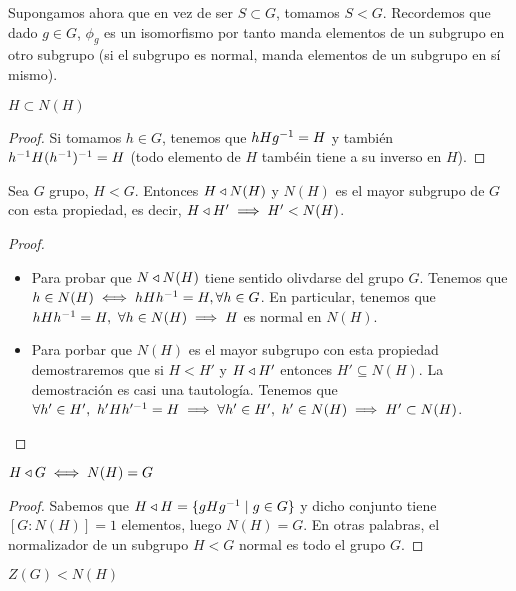 Supongamos ahora que en vez de ser $S \subset G$, tomamos $S < G$. Recordemos que dado $g\in G$, $\phi_g$ es un isomorfismo por tanto manda elementos de un subgrupo en otro subgrupo (si el subgrupo es normal, manda elementos de un subgrupo en sí mismo).

\begin{pro}
	$H \subset N(H)$
\end{pro}

\begin{proof}
	Si tomamos $h \in G$, tenemos que $hHg^{-1} = H$ y también $h^{-1}H(h^{-1})^{-1} = H$ (todo elemento de $H$ tambéin tiene a su inverso en $H$).
\end{proof}

\begin{thm}
	Sea $G$ grupo, $H < G$. Entonces $H \mathbin{\triangleleft} N(H)$ y $N(H)$ es el mayor subgrupo de $G$ con esta propiedad, es decir, $H \mathbin{\triangleleft} H' \implies H' < N(H)$.
\end{thm}

\begin{proof}$ $\newline
	\begin{itemize}
		\item Para probar que $N\mathbin{\triangleleft} N(H)$ tiene sentido olivdarse del grupo $G$. Tenemos que $h \in N(H) \iff hHh^{-1} = H, \forall h \in G$. En particular, tenemos que $hHh^{-1} = H,\ \forall h \in N(H) \implies H$ es normal en $N(H)$.
		
		\item Para porbar que $N(H)$ es el mayor subgrupo con esta propiedad demostraremos que si $H < H'$ y $H \mathbin{\triangleleft} H'$ entonces $H' \subseteq N(H)$. La demostración es casi una tautología. Tenemos que $\forall h' \in H',\ h'Hh'^{-1} = H \implies \forall h' \in H',\ h' \in N(H) \implies H' \subset N(H)$.
	\end{itemize}
\end{proof}

\begin{cor}
	$H \mathbin{\triangleleft} G \iff N(H) = G$
\end{cor}

\begin{proof}
	Sabemos que $H\mathbin{\triangleleft} H = \{gHg^{-1} \mid g \in G\}$ y dicho conjunto tiene $[G:N(H)] = 1$ elementos, luego $N(H) = G$. En otras palabras, el normalizador de un subgrupo $H < G$ normal es todo el grupo $G$.
\end{proof}

\begin{pro}
	$Z(G) < N(H)$
\end{pro}

